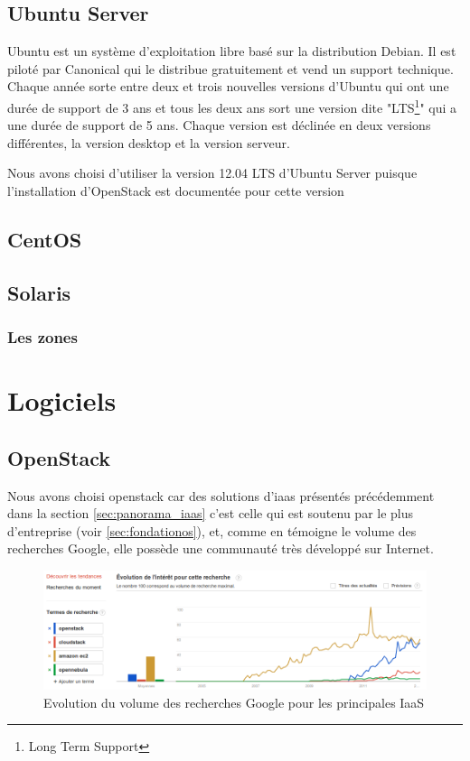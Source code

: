 \documentclass[a4paper,oneside]{report}
\begin{document}
\section{Ubuntu Server} \label{cha:ubuntu}
Ubuntu est un système d'exploitation libre basé sur la distribution Debian. Il est piloté par Canonical qui le distribue gratuitement et vend un support technique.
Chaque année sorte entre deux et trois nouvelles versions d'Ubuntu qui ont une durée de support de 3 ans et tous les deux ans sort une version dite "LTS\footnote{Long Term Support}" qui a une durée de support de 5 ans. Chaque version est déclinée en deux versions différentes, la version desktop et la version serveur.

Nous avons choisi d'utiliser la version 12.04 LTS d'Ubuntu Server puisque l'installation d'OpenStack est documentée pour cette version
\section{CentOS}

\section{Solaris}

\subsection{Les zones}


\chapter{Logiciels}
\section{OpenStack}
Nous avons choisi \gls{openstack} car des solutions d'\gls{iaas} présentés précédemment dans la section \ref{sec:panorama_iaas} c'est celle qui est soutenu par le plus d'entreprise (voir \ref{sec:fondationos}), et, comme en témoigne le volume des recherches Google, elle possède une communauté très développé sur Internet.
\begin{figure}[h!]
\centering
\includegraphics[resolution=140]{images/recherches_iaas.png}
\caption{Evolution du volume des recherches Google pour les principales IaaS}
\end{figure}
\end{document}
